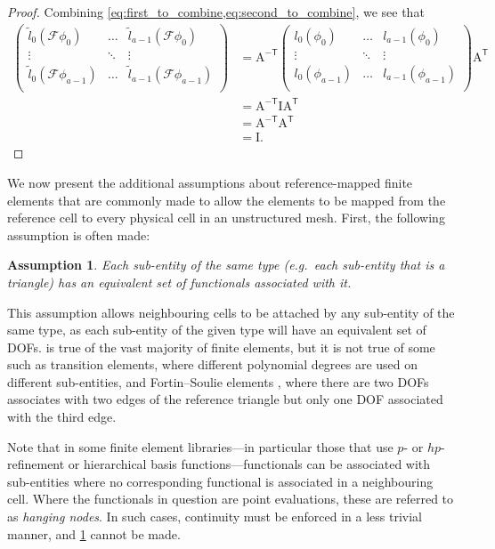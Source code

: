 \documentclass[sn-mathphys-num]{sn-jnl}%
\theoremstyle{thmstyleone}%
\newtheorem{assumption}{Assumption}
\newcommand{\mat}[1]{\boldsymbol{\mathrm{#1}}}
\theoremstyle{thmstyletwo}%
\theoremstyle{thmstylethree}%
\begin{document}
\begin{proof}
Combining \cref{eq:first_to_combine,eq:second_to_combine}, we see that
\begin{align*}
\begin{pmatrix}
\tilde{l}_0(\mathcal{F}\phi_0)&\dots&\tilde{l}_{a-1}(\mathcal{F}\phi_0)\\
\vdots&\ddots&\vdots\\
\tilde{l}_0(\mathcal{F}\phi_{a-1})&\dots&\tilde{l}_{a-1}(\mathcal{F}\phi_{a-1})\\
\end{pmatrix}
&=
\mat{A}^{-\mathsf{T}}
\begin{pmatrix}
l_0(\phi_0)&\dots&l_{a-1}(\phi_0)\\
\vdots&\ddots&\vdots\\
l_0(\phi_{a-1})&\dots&l_{a-1}(\phi_{a-1})\\
\end{pmatrix}
\mat{A}^\mathsf{T}
\\&=
\mat{A}^{-\mathsf{T}}
\mat{I}
\mat{A}^\mathsf{T}
\\&=
\mat{A}^{-\mathsf{T}}
\mat{A}^\mathsf{T}
\\&=
\mat{I}.
\end{align*}
\end{proof}

We now present the additional assumptions about reference-mapped finite elements that are commonly made to allow the elements
to be mapped from the reference cell to every physical cell in an unstructured mesh.
First, the following assumption is often made:

\begin{assumption}\label{a:equivalent}
Each sub-entity of the same type (e.g.~each sub-entity that is a triangle) has an equivalent set of functionals associated with it.
\end{assumption}

This assumption allows neighbouring cells to be attached by any sub-entity of the same type,
as each sub-entity of the given type will have an equivalent set of DOFs.
 is true of the vast majority of finite elements, but it is not true of some such as
transition elements, where different polynomial degrees are used on different sub-entities,
and Fortin--Soulie elements \cite{fortin-soulie}, where there are two DOFs associates with two edges
of the reference triangle but only one DOF associated with the third edge.

Note that in some finite element libraries---in particular those that use $p$- or $hp$-refinement
or hierarchical basis functions---functionals can be associated with sub-entities where no corresponding
functional is associated in a neighbouring cell. Where the functionals in question are point
evaluations, these are referred to as \emph{hanging nodes}. In such cases, continuity must be
enforced in a less trivial manner, and \cref{a:equivalent} cannot be made.
\end{document}
